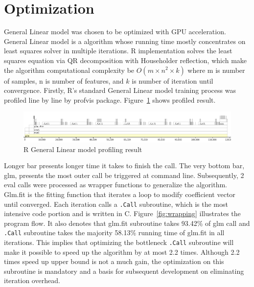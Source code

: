 \documentclass[English]{dicomopapers}
\begin{document}
\section{Optimization}
General Linear model was chosen to be optimized with GPU acceleration. General Linear model is a algorithm whose running time mostly concentrates on least squares solver in multiple iterations. R implementation solves the least squares equation via QR decomposition with Householder reflection, which make the algorithm computational complexity be \(O(m \times n ^ 2 \times k)\) where m is number of samples, n is number of features, and \(k\) is number of iteration until convergence.\newline
Firstly, R's standard General Linear model training process was profiled line by line by profvis package. Figure~\ref{fig:profvis} shows profiled result.\newline
\begin{figure}[ht]
  \vspace*{-1cm}
  \centering
  \includegraphics[width=\columnwidth,natwidth=1021,natheight=151]{profvis.png}
  \caption{R General Linear model profiling result}\label{fig:profvis}
\end{figure}
\newline
Longer bar presents longer time it takes to finish the call. The very bottom bar, glm, presents the most outer call be triggered at command line. Subsequently, 2 eval calls were processed as wrapper functions to generalize the algorithm. Glm.fit is the fitting function that iterates a loop to modify coefficient vector until converged. Each iteration calls a \texttt{.Call} subroutine, which is the most intensive code portion and is written in C. Figure~\ref{fig:wrapping} illustrates the program flow. It also denotes that glm.fit subroutine takes 93.42\% of glm call and \texttt{.Call} subroutine takes the majority 58.13\% running time of glm.fit in all iterations. This implies that optimizing the bottleneck \texttt{.Call} subroutine will make it possible to speed up the algorithm by at most 2.2 times. Although 2.2 times speed up upper bound is not a much gain, the optimization on this subroutine is mandatory and a basis for subsequent development on eliminating iteration overhead.\newline
\end{document}
